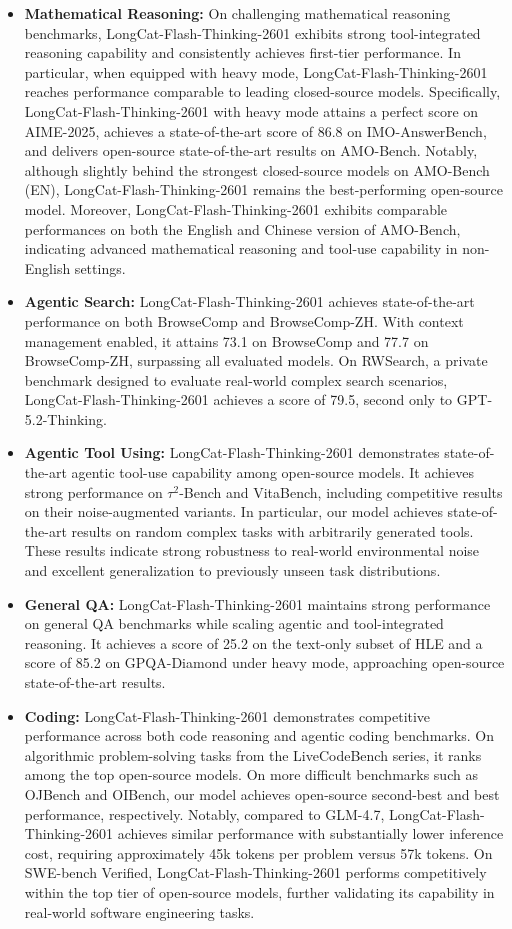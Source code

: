 \documentclass{article}
\newcommand{\longcat}{LongCat-Flash-Thinking-2601\xspace}
\begin{document}
\begin{itemize}
\item \textbf{Mathematical Reasoning:} 
On challenging mathematical reasoning benchmarks, \longcat exhibits strong tool-integrated reasoning capability and consistently achieves first-tier performance.
In particular, when equipped with heavy mode, \longcat reaches performance comparable to leading closed-source models.
Specifically, \longcat with heavy mode attains a perfect score on AIME-2025, achieves a state-of-the-art score of 86.8 on IMO-AnswerBench, and delivers open-source state-of-the-art results on AMO-Bench.
Notably, although slightly behind the strongest closed-source models on AMO-Bench (EN), \longcat remains the best-performing open-source model.
Moreover, \longcat exhibits comparable performances on both the English and Chinese version of AMO-Bench, indicating advanced mathematical reasoning and tool-use capability in non-English settings.
\item \textbf{Agentic Search:} 
\longcat achieves state-of-the-art performance on both BrowseComp and BrowseComp-ZH.
With context management enabled, it attains 73.1 on BrowseComp and 77.7 on BrowseComp-ZH, surpassing all evaluated models.
On RWSearch, a private benchmark designed to evaluate real-world complex search scenarios, \longcat achieves a score of 79.5, second only to GPT-5.2-Thinking.

\item \textbf{Agentic Tool Using:} 
\longcat demonstrates state-of-the-art agentic tool-use capability among open-source models.
It achieves strong performance on $\tau^2$-Bench and VitaBench, including competitive results on their noise-augmented variants.
In particular, our model achieves state-of-the-art results on random complex tasks with arbitrarily generated tools.
These results indicate strong robustness to real-world environmental noise and excellent generalization to previously unseen task distributions.

\item \textbf{General QA:} 
\longcat maintains strong performance on general QA benchmarks while scaling agentic and tool-integrated reasoning.
It achieves a score of 25.2 on the text-only subset of HLE and a score of 85.2 on GPQA-Diamond under heavy mode, approaching open-source state-of-the-art results.

\item \textbf{Coding:} 
\longcat demonstrates competitive performance across both code reasoning and agentic coding benchmarks.
On algorithmic problem-solving tasks from the LiveCodeBench series, it ranks among the top open-source models.
On more difficult benchmarks such as OJBench and OIBench, our model achieves open-source second-best and best performance, respectively.
Notably, compared to GLM-4.7, \longcat achieves similar performance with substantially lower inference cost, requiring approximately 45k tokens per problem versus 57k tokens.
On SWE-bench Verified, \longcat performs competitively within the top tier of open-source models, further validating its capability in real-world software engineering tasks.

\end{itemize}
\end{document}
